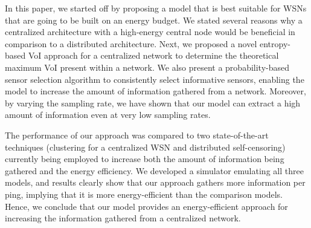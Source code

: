 In this paper, we started off by proposing a model that is best
suitable for WSNs that are going to be built on an energy budget. We
stated several reasons why a centralized architecture with a
high-energy central node would be beneficial in comparison to a
distributed architecture. Next, we proposed a novel entropy-based VoI
approach for a centralized network to determine the theoretical
maximum VoI present within a network. We also present a
probability-based sensor selection algorithm to consistently select
informative sensors, enabling the model to increase the amount of
information gathered from a network. Moreover, by varying the sampling
rate, we have shown that our model can extract a high amount of
information even at very low sampling rates.

The performance of our approach was compared to two state-of-the-art
techniques (clustering for a centralized WSN and distributed
self-censoring) currently being employed to increase both the amount
of information being gathered and the energy efficiency. We developed
a simulator emulating all three models, and results clearly show that
our approach gathers more information per ping, implying that it is
more energy-efficient than the comparison models. Hence, we conclude
that our model provides an energy-efficient approach for increasing
the information gathered from a centralized network.